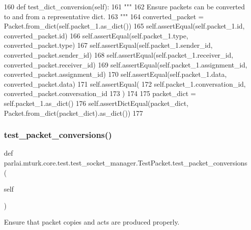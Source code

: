 \begin{DoxyCode}
160     \textcolor{keyword}{def }test\_dict\_conversion(self):
161         \textcolor{stringliteral}{"""}
162 \textcolor{stringliteral}{        Ensure packets can be converted to and from a representative dict.}
163 \textcolor{stringliteral}{        """}
164         converted\_packet = Packet.from\_dict(self.packet\_1.as\_dict())
165         self.assertEqual(self.packet\_1.id, converted\_packet.id)
166         self.assertEqual(self.packet\_1.type, converted\_packet.type)
167         self.assertEqual(self.packet\_1.sender\_id, converted\_packet.sender\_id)
168         self.assertEqual(self.packet\_1.receiver\_id, converted\_packet.receiver\_id)
169         self.assertEqual(self.packet\_1.assignment\_id, converted\_packet.assignment\_id)
170         self.assertEqual(self.packet\_1.data, converted\_packet.data)
171         self.assertEqual(
172             self.packet\_1.conversation\_id, converted\_packet.conversation\_id
173         )
174 
175         packet\_dict = self.packet\_1.as\_dict()
176         self.assertDictEqual(packet\_dict, Packet.from\_dict(packet\_dict).as\_dict())
177 
\end{DoxyCode}
\mbox{\label{classparlai_1_1mturk_1_1core_1_1test_1_1test__socket__manager_1_1TestPacket_a6336e783e860361ac933d5737298d26f}} 
\subsubsection{\texorpdfstring{test\+\_\+packet\+\_\+conversions()}{test\_packet\_conversions()}}
{\footnotesize\ttfamily def parlai.\+mturk.\+core.\+test.\+test\+\_\+socket\+\_\+manager.\+Test\+Packet.\+test\+\_\+packet\+\_\+conversions (\begin{DoxyParamCaption}\item[{}]{self }\end{DoxyParamCaption})}

\begin{DoxyVerb}Ensure that packet copies and acts are produced properly.
\end{DoxyVerb}
 

